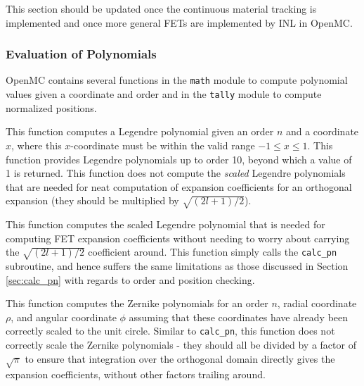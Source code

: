 \documentclass[10pt]{article}
\newcounter{subsubsubsection}[subsubsection]
\numberwithin{equation}{section} %
\begin{document}
\color{magenta}
This section should be updated once the continuous material tracking is implemented and once more general FETs are implemented by INL in OpenMC.
\color{black}

\subsubsection{Evaluation of Polynomials}
OpenMC contains several functions in the {\tt math} module to compute polynomial values given a coordinate and order and in the {\tt tally} module to compute normalized positions. %

\label{sec:calc_pn}
This function computes a Legendre polynomial given an order \(n\) and a coordinate \(x\), where this \(x\)-coordinate must be within the valid range \(-1\leq x\leq1\). This function provides Legendre polynomials up to order 10, beyond which a value of 1 is returned. This function does not compute the {\it scaled} Legendre polynomials that are needed for neat computation of expansion coefficients for an orthogonal expansion (they should be multiplied by \(\sqrt{(2l+1)/2}\)). 

This function computes the scaled Legendre polynomial that is needed for computing FET expansion coefficients without needing to worry about carrying the \(\sqrt{(2l+1)/2}\) coefficient around. This function simply calls the {\tt calc\_pn} subroutine, and hence suffers the same limitations as those discussed in Section \ref{sec:calc_pn} with regards to order and position checking. 

\label{sec:calc_zn}
This function computes the Zernike polynomials for an order \(n\), radial coordinate \(\rho\), and angular coordinate \(\phi\) assuming that these coordinates have already been correctly scaled to the unit circle. Similar to {\tt calc\_pn}, this function does not correctly scale the Zernike polynomials - they should all be divided by a factor of \(\sqrt{\pi}\) to ensure that integration over the orthogonal domain directly gives the expansion coefficients, without other factors trailing around. 

\end{document}
